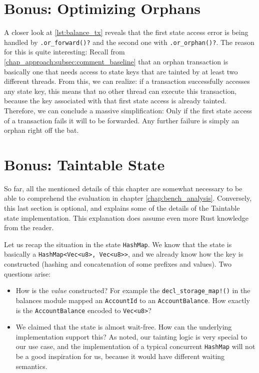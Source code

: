 \section{Bonus: Optimizing Orphans} \label{chap_impl:sec:opt_orph}

A closer look at \ref{lst:balance_tx} reveals that the first state access error is being handled by
\texttt{.or\_forward()?} and the second one with \texttt{.or\_orphan()?}. The reason for this is
quite interesting: Recall from \ref{chap_approach:subsec:comment_baseline} that an orphan
transaction is basically one that needs access to state keys that are tainted by at least two
different threads. From this, we can realize: if a transaction successfully accesses any state key,
this means that no other thread can execute this transaction, because the key associated with that
first state access is already tainted. Therefore, we can conclude a massive simplification: Only if
the first state access of a transaction fails it will to be forwarded. Any further failure is simply
an orphan right off the bat.

\section{Bonus: Taintable State} \label{chap_impl:sec:bonus}

So far, all the mentioned details of this chapter are somewhat necessary to be able to comprehend
the evaluation in chapter \ref{chap:bench_analysis}. Conversely, this last section is optional, and
explains some of the details of the Taintable state implementation. This explanation does assume
even more Rust knowledge from the reader.

Let us recap the situation in the state \texttt{HashMap}. We know that the state is basically a
\texttt{HashMap<Vec<u8>, Vec<u8>>}, and we already know how the key is constructed (hashing and
concatenation of some prefixes and values). Two questions arise:

\begin{itemize}
	\item How is the \textit{value} constructed? For example the \texttt{decl\_storage\_map!()} in
	the balances module mapped an \texttt{AccountId} to an \texttt{AccountBalance}. How exactly is
	the \texttt{AccountBalance} encoded to \texttt{Vec<u8>}?
	\item We claimed that the state is almost wait-free. How can the underlying implementation
	support this? As noted, our tainting logic is very special to our use case, and the
	implementation of a typical concurrent \texttt{HashMap} will not be a good inspiration for us,
	because it would have different waiting semantics.
\end{itemize}

